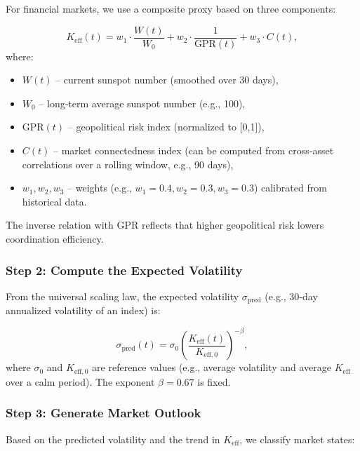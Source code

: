 \documentclass[11pt,a4paper]{article}
\theoremstyle{remark}
\begin{document}
	For financial markets, we use a composite proxy based on three components:
	
	\begin{equation}
		K_{\mathrm{eff}}(t) = w_1 \cdot \frac{W(t)}{W_0} + w_2 \cdot \frac{1}{\text{GPR}(t)} + w_3 \cdot C(t),
		\label{eq:keff_composite}
	\end{equation}
	where:
	\begin{itemize}
		\item \(W(t)\) – current sunspot number (smoothed over 30 days),
		\item \(W_0\) – long‑term average sunspot number (e.g., 100),
		\item \(\text{GPR}(t)\) – geopolitical risk index (normalized to [0,1]),
		\item \(C(t)\) – market connectedness index (can be computed from cross‑asset correlations over a rolling window, e.g., 90 days),
		\item \(w_1, w_2, w_3\) – weights (e.g., \(w_1=0.4, w_2=0.3, w_3=0.3\)) calibrated from historical data.
	\end{itemize}
	The inverse relation with GPR reflects that higher geopolitical risk lowers coordination efficiency.
	
	\subsubsection{Step 2: Compute the Expected Volatility}
	
	From the universal scaling law, the expected volatility \(\sigma_{\text{pred}}\) (e.g., 30‑day annualized volatility of an index) is:
	
	\begin{equation}
		\sigma_{\text{pred}}(t) = \sigma_0 \left( \frac{K_{\mathrm{eff}}(t)}{K_{\mathrm{eff,0}}} \right)^{-\beta},
		\label{eq:volatility}
	\end{equation}
	where \(\sigma_0\) and \(K_{\mathrm{eff,0}}\) are reference values (e.g., average volatility and average \(K_{\mathrm{eff}}\) over a calm period). The exponent \(\beta = 0.67\) is fixed.
	
	\subsubsection{Step 3: Generate Market Outlook}
	
	Based on the predicted volatility and the trend in \(K_{\mathrm{eff}}\), we classify market states:
	
\end{document}
